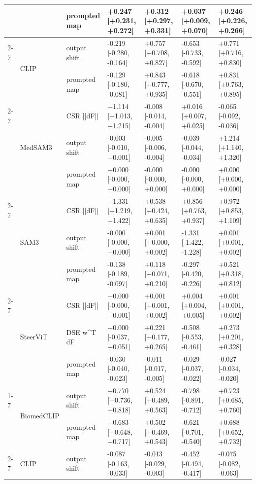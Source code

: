 \begin{tabular}{lllllll}
 &  & prompted map & +0.247 [+0.231, +0.272] & +0.312 [+0.297, +0.331] & +0.037 [+0.009, +0.070] & +0.246 [+0.226, +0.266] \\
\cline{2-7}
 & \multirow[t]{2}{*}{CLIP} & output shift & -0.219 [-0.280, -0.164] & +0.757 [+0.708, +0.827] & -0.653 [-0.733, -0.592] & +0.771 [+0.716, +0.830] \\
 &  & prompted map & -0.129 [-0.180, -0.081] & +0.843 [+0.777, +0.935] & -0.618 [-0.670, -0.551] & +0.831 [+0.763, +0.895] \\
\cline{2-7}
 & \multirow[t]{3}{*}{MedSAM3} & CSR  ||dF|| & +1.114 [+1.013, +1.215] & -0.008 [-0.014, -0.004] & +0.016 [+0.007, +0.025] & -0.065 [-0.092, -0.036] \\
 &  & output shift & -0.003 [-0.010, +0.001] & -0.005 [-0.006, -0.004] & -0.039 [-0.044, -0.034] & +1.214 [+1.140, +1.320] \\
 &  & prompted map & +0.000 [-0.000, +0.000] & -0.000 [-0.000, +0.000] & -0.000 [-0.000, +0.000] & +0.000 [+0.000, +0.000] \\
\cline{2-7}
 & \multirow[t]{3}{*}{SAM3} & CSR  ||dF|| & +1.331 [+1.219, +1.422] & +0.538 [+0.424, +0.635] & +0.856 [+0.763, +0.937] & +0.972 [+0.853, +1.109] \\
 &  & output shift & -0.000 [-0.000, +0.000] & +0.001 [+0.000, +0.002] & -1.331 [-1.422, -1.228] & +0.001 [+0.001, +0.002] \\
 &  & prompted map & -0.138 [-0.189, -0.097] & +0.118 [+0.071, +0.210] & -0.297 [-0.420, -0.226] & +0.521 [+0.318, +0.812] \\
\cline{2-7}
 & \multirow[t]{3}{*}{SteerViT} & CSR  ||dF|| & +0.000 [-0.000, +0.001] & +0.001 [+0.001, +0.002] & +0.004 [+0.004, +0.005] & +0.001 [+0.001, +0.002] \\
 &  & DSE  w^T dF & +0.000 [-0.037, +0.051] & +0.221 [+0.177, +0.265] & -0.508 [-0.553, -0.461] & +0.273 [+0.201, +0.328] \\
 &  & prompted map & -0.030 [-0.040, -0.023] & -0.011 [-0.017, -0.005] & -0.029 [-0.037, -0.022] & -0.027 [-0.034, -0.020] \\
\cline{1-7} \cline{2-7}
\multirow[t]{13}{*}{kvasir} & \multirow[t]{2}{*}{BiomedCLIP} & output shift & +0.770 [+0.736, +0.818] & +0.524 [+0.489, +0.563] & -0.798 [-0.891, -0.712] & +0.723 [+0.685, +0.760] \\
 &  & prompted map & +0.683 [+0.648, +0.717] & +0.502 [+0.469, +0.543] & -0.621 [-0.701, -0.540] & +0.688 [+0.652, +0.732] \\
\cline{2-7}
 & \multirow[t]{2}{*}{CLIP} & output shift & -0.087 [-0.163, -0.033] & -0.013 [-0.029, -0.003] & -0.452 [-0.494, -0.417] & -0.075 [-0.082, -0.063] \\

\end{tabular}
